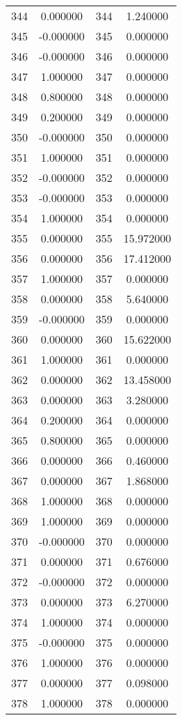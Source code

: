\documentclass[12pt]{article}
\begin{document}
\begin{longtable}{@{}cccc@{}}
344 & 0.000000 & 344 & 1.240000 \\
345 & -0.000000 & 345 & 0.000000 \\
346 & -0.000000 & 346 & 0.000000 \\
347 & 1.000000 & 347 & 0.000000 \\
348 & 0.800000 & 348 & 0.000000 \\
349 & 0.200000 & 349 & 0.000000 \\
350 & -0.000000 & 350 & 0.000000 \\
351 & 1.000000 & 351 & 0.000000 \\
352 & -0.000000 & 352 & 0.000000 \\
353 & -0.000000 & 353 & 0.000000 \\
354 & 1.000000 & 354 & 0.000000 \\
355 & 0.000000 & 355 & 15.972000 \\
356 & 0.000000 & 356 & 17.412000 \\
357 & 1.000000 & 357 & 0.000000 \\
358 & 0.000000 & 358 & 5.640000 \\
359 & -0.000000 & 359 & 0.000000 \\
360 & 0.000000 & 360 & 15.622000 \\
361 & 1.000000 & 361 & 0.000000 \\
362 & 0.000000 & 362 & 13.458000 \\
363 & 0.000000 & 363 & 3.280000 \\
364 & 0.200000 & 364 & 0.000000 \\
365 & 0.800000 & 365 & 0.000000 \\
366 & 0.000000 & 366 & 0.460000 \\
367 & 0.000000 & 367 & 1.868000 \\
368 & 1.000000 & 368 & 0.000000 \\
369 & 1.000000 & 369 & 0.000000 \\
370 & -0.000000 & 370 & 0.000000 \\
371 & 0.000000 & 371 & 0.676000 \\
372 & -0.000000 & 372 & 0.000000 \\
373 & 0.000000 & 373 & 6.270000 \\
374 & 1.000000 & 374 & 0.000000 \\
375 & -0.000000 & 375 & 0.000000 \\
376 & 1.000000 & 376 & 0.000000 \\
377 & 0.000000 & 377 & 0.098000 \\
378 & 1.000000 & 378 & 0.000000 \\

\end{longtable}
\end{document}
